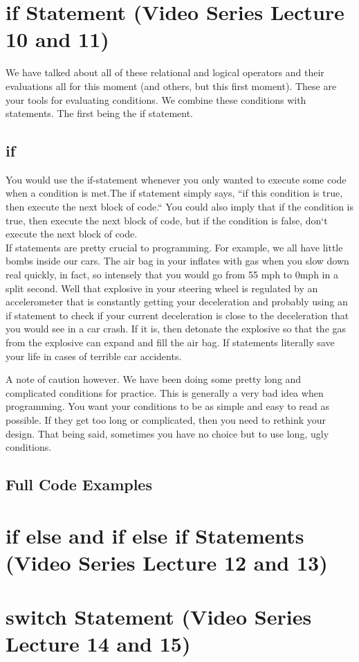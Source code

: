 \documentclass[11]{article}
\begin{document}
\section{if Statement (Video Series Lecture 10 and 11)}
We have talked about all of these relational and logical operators and their evaluations all for this moment (and others, but this first moment). These are your tools for evaluating conditions. We combine these conditions with statements. The first being the if statement.\\
\subsection{if}
You would use the if-statement whenever you only wanted to execute some code when a condition is met.The if statement simply says, ``if this condition is true, then execute the next block of code.`` You could also imply that if the condition is true, then execute the next block of code, but if the condition is false, don`t execute the next block of code.\\

If statements are pretty crucial to programming. For example, we all have little bombs inside our cars. The air bag in your inflates with gas when you slow down real quickly, in fact, so intensely that you would go from 55 mph to 0mph in a split second. Well that explosive in your steering wheel is regulated by an accelerometer that is constantly getting your deceleration and probably using an if statement to check if your current deceleration is close to the deceleration that you would see in a car crash. If it is, then detonate the explosive so that the gas from the explosive can expand and fill the air bag. If statements literally save your life in cases of terrible car accidents.

A note of caution however. We have been doing some pretty long and complicated conditions for practice. This is generally a very bad idea when programming. You want your conditions to be as simple and easy to read as possible. If they get too long or complicated, then you need to rethink your design. That being said, sometimes you have no choice but to use long, ugly conditions.
\subsection{Full Code Examples}
\section{if else and if else if Statements (Video Series Lecture 12 and 13)}
\section{switch Statement (Video Series Lecture 14 and 15)}
\end{document}
